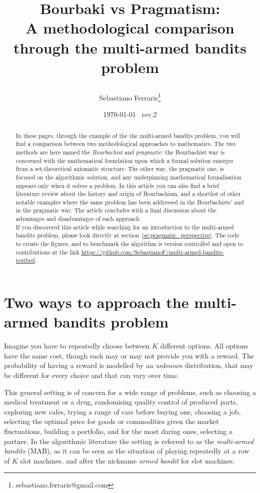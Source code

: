 \documentclass[]{scrartcl}
\title{
    Bourbaki vs Pragmatism: \\ A methodological comparison through the multi-armed bandits problem

}
\author{Sebastiano Ferraris\footnote{sebastiano.ferraris@gmail.com}}
\date{\today ~ rev.2}
\theoremstyle{definition}
\begin{document}
\maketitle

\begin{abstract}
    In these pages, through the example of the the multi-armed bandits problem, you will find a comparison between two methodological approaches to mathematics.
    The two methods are here named the \emph{Bourbachist} and \emph{pragmatic}: the Bourbachist way is concerned with the mathematical foundation upon which a formal solution emerges from a set-theoretical axiomatic structure. The other way, the pragmatic one, is focused on the algorithmic solution, and any underpinning mathematical formalisation appears only when it solves a problem.
    In this article you can also find a brief literature review about the history and origin of Bourbachism, and a shortlist of other notable examples where the same problem has been addressed in the Bourbachists' and in the pragmatic way. The article concludes with a final discussion about the advantages and disadvantages of each approach. \\

\noindent
If you discovered this article while searching for an introduction to the multi-armed bandits problem, please look directly at section~\ref{se:pragmatic_perspective}. The code to create the figures, and to benchmark the algorithm is version controlled and open to contributions at the link \href{https://github.com/SebastianoF/multi-armed-bandits-testbed}{https://github.com/SebastianoF/multi-armed-bandits-testbed}.
\end{abstract}


\section{Two ways to approach the multi-armed bandits problem}
\label{se:intro}
Imagine you have to repeatedly choose between $K$ different options. All options have the same cost, though each may or may not provide you with a reward. The probability of having a reward is modelled by an \emph{unknown} distribution, that may be different for every choice and that can vary over time.

This general setting is of concern for a wide range of problems, such as choosing a medical treatment or a drug, randomising quality control of produced parts, exploring new cafes, trying a range of cars before buying one, choosing a job, selecting the optimal price for goods or commodities given the market fluctuations, building a portfolio, and for the most daring ones, selecting a partner. In the algorithmic literature the setting is referred to as the \emph{multi-armed bandits} (MAB), as it can be seen as the situation of playing repeatedly at a row of $K$ slot machines, and after the nickname \emph{armed bandit} for slot machines.
\end{document}
